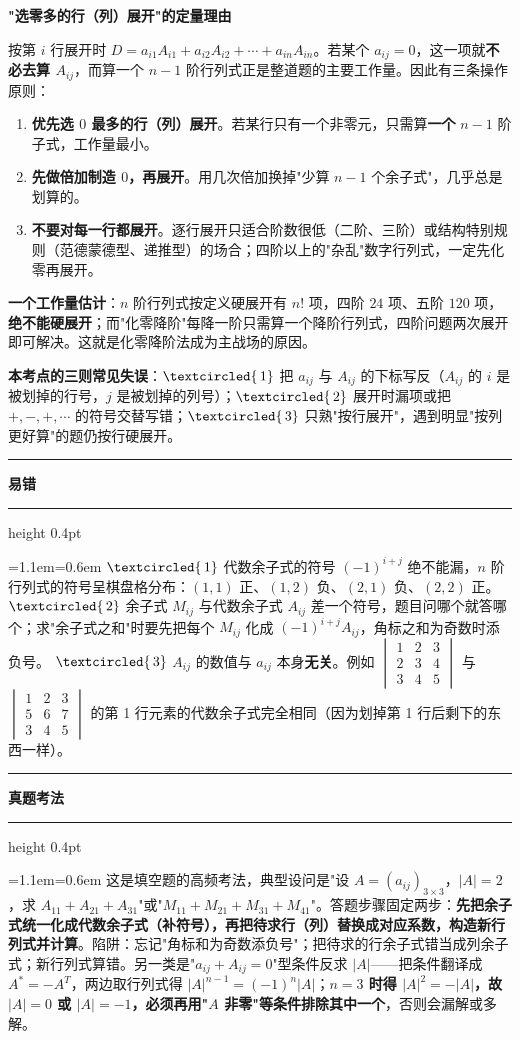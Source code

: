 \documentclass[11pt,openany,UTF8]{ctexbook}
\newcommand{\circled}[1]{\textcircled{\scriptsize\,#1}}
\newcommand{\callouthead}[2]{%
  \par\addvspace{7pt}\noindent
  {\color{#1}\rule[-0.15em]{3pt}{1.05em}}\hspace{0.5em}%
  {\bfseries\color{#1}#2}\par\nobreak\vspace{-0.35em}%
  {\color{rulesep}\hrule height 0.4pt}\nobreak\vspace{0.45em}%
  \begingroup\small\setlength{\parindent}{0pt}%
  \leftskip=1.1em\rightskip=0.6em\noindent\ignorespaces}
\newcommand{\calloutend}{\par\endgroup\addvspace{7pt}}
\newenvironment{callwarn}[1]{\callouthead{warnbar}{#1}}{\calloutend}
\newenvironment{callexam}[1]{\callouthead{exambar}{#1}}{\calloutend}
\begin{document}
\textbf{"选零多的行（列）展开"的定量理由}

按第 $i$ 行展开时 $D=a_{i1}A_{i1}+a_{i2}A_{i2}+\cdots+a_{in}A_{in}$。若某个 $a_{ij}=0$，这一项就\textbf{不必去算 $A_{ij}$}，而算一个 $n-1$ 阶行列式正是整道题的主要工作量。因此有三条操作原则：

\begin{enumerate}
\item \textbf{优先选 $0$ 最多的行（列）展开}。若某行只有一个非零元，只需算\textbf{一个} $n-1$ 阶子式，工作量最小。
\item \textbf{先做倍加制造 $0$，再展开}。用几次倍加换掉"少算 $n-1$ 个余子式"，几乎总是划算的。
\item \textbf{不要对每一行都展开}。逐行展开只适合阶数很低（二阶、三阶）或结构特别规则（范德蒙德型、递推型）的场合；四阶以上的"杂乱"数字行列式，一定先化零再展开。
\end{enumerate}
\textbf{一个工作量估计}：$n$ 阶行列式按定义硬展开有 $n!$ 项，四阶 $24$ 项、五阶 $120$ 项，\textbf{绝不能硬展开}；而"化零降阶"每降一阶只需算一个降阶行列式，四阶问题两次展开即可解决。这就是化零降阶法成为主战场的原因。

\textbf{本考点的三则常见失误}：$\circled{1}$ 把 $a_{ij}$ 与 $A_{ij}$ 的下标写反（$A_{ij}$ 的 $i$ 是被划掉的行号，$j$ 是被划掉的列号）；$\circled{2}$ 展开时漏项或把 $+,-,+,\cdots$ 的符号交替写错；$\circled{3}$ 只熟"按行展开"，遇到明显"按列更好算"的题仍按行硬展开。

\begin{callwarn}{易错}
$\circled{1}$ 代数余子式的符号 $(-1)^{i+j}$ 绝不能漏，$n$ 阶行列式的符号呈棋盘格分布：$(1,1)$ 正、$(1,2)$ 负、$(2,1)$ 负、$(2,2)$ 正。 $\circled{2}$ 余子式 $M_{ij}$ 与代数余子式 $A_{ij}$ 差一个符号，题目问哪个就答哪个；求"余子式之和"时要先把每个 $M_{ij}$ 化成 $(-1)^{i+j}A_{ij}$，角标之和为奇数时添负号。 $\circled{3}$ $A_{ij}$ 的数值与 $a_{ij}$ 本身\textbf{无关}。例如 $\begin{vmatrix}1&2&3\\2&3&4\\3&4&5\end{vmatrix}$ 与 $\begin{vmatrix}1&2&3\\5&6&7\\3&4&5\end{vmatrix}$ 的第 1 行元素的代数余子式完全相同（因为划掉第 1 行后剩下的东西一样）。

\end{callwarn}

\begin{callexam}{真题考法}
这是填空题的高频考法，典型设问是"设 $A=(a_{ij})_{3\times3}$，$\vert A\vert=2$，求 $A_{11}+A_{21}+A_{31}$"或"$M_{11}+M_{21}+M_{31}+M_{41}$"。答题步骤固定两步：\textbf{先把余子式统一化成代数余子式（补符号），再把待求行（列）替换成对应系数，构造新行列式并计算}。陷阱：忘记"角标和为奇数添负号"；把待求的行余子式错当成列余子式；新行列式算错。另一类是"$a_{ij}+A_{ij}=0$"型条件反求 $\vert A\vert$——把条件翻译成 $A^*=-A^T$，两边取行列式得 $\vert A\vert^{n-1}=(-1)^n\vert A\vert$；\textbf{$n=3$ 时得 $\vert A\vert^2=-\vert A\vert$，故 $\vert A\vert=0$ 或 $\vert A\vert=-1$，必须再用"$A$ 非零"等条件排除其中一个}，否则会漏解或多解。

\end{callexam}
\end{document}

